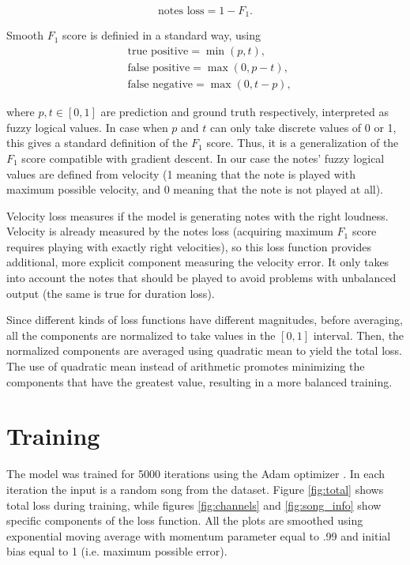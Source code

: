 \documentclass[en]{pracamgr}
\begin{document}
\begin{equation}
    \textrm{notes loss} = 1 - F_1.
\end{equation}

Smooth $F_1$ score is definied in a standard way, using
\nopagebreak
\begin{align}
    & \textrm{true positive} = \min(p, t), \\
    & \textrm{false positive} = \max(0, p - t), \\
    & \textrm{false negative} = \max(0, t - p),
\end{align}

where $p,t\in[0,1]$ are prediction and ground truth respectively, interpreted as fuzzy logical values.
In case when $p$ and $t$ can only take discrete values of 0 or 1, this gives a standard definition of the $F_1$ score.
Thus, it is a generalization of the $F_1$ score compatible with gradient descent.
In our case the notes' fuzzy logical values are defined from velocity (1 meaning that the note is played with maximum possible velocity, and 0 meaning that the note is not played at all).

Velocity loss measures if the model is generating notes with the right loudness.
Velocity is already measured by the notes loss (acquiring maximum $F_1$ score requires playing with exactly right velocities), so this loss function provides additional, more explicit component measuring the velocity error.
It only takes into account the notes that should be played to avoid problems with unbalanced output (the same is true for duration loss).

Since different kinds of loss functions have different magnitudes, before averaging, all the components are normalized to take values in the $[0,1]$ interval.
Then, the normalized components are averaged using quadratic mean to yield the total loss. The use of quadratic mean instead of arithmetic promotes minimizing the components that have the greatest value, resulting in a more balanced training.

\section{Training}

The model was trained for 5000 iterations using the Adam optimizer \cite{adam}.
In each iteration the input is a random song from the dataset.
Figure \ref{fig:total} shows total loss during training, while figures \ref{fig:channels} and \ref{fig:song_info} show specific components of the loss function.
All the plots are smoothed using exponential moving average with momentum parameter equal to .99 and initial bias equal to 1 (i.e. maximum possible error).
\end{document}

